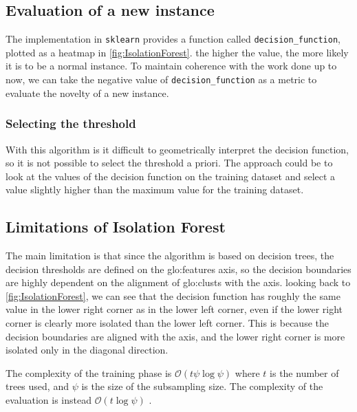 \subsection{Evaluation of a new instance}
\label{sec:iforest_eval}
The implementation in \texttt{sklearn} provides a function called \texttt{decision\_function}, plotted as a heatmap in \autoref{fig:IsolationForest}. the higher the value, the more likely it is to be a normal instance.
To maintain coherence with the work done up to now, we can take the negative value of \texttt{decision\_function} as a metric to evaluate the novelty of a new instance.

\subsubsection{Selecting the threshold}
\label{sec:iforest_threshold}
With this algorithm is it difficult to geometrically interpret the decision function, so it is not possible to select the threshold a priori. The approach could be to look at the values of the decision function on the training dataset and select a value slightly higher than the maximum value for the training dataset.

\subsection{Limitations of Isolation Forest}
The main limitation is that since the algorithm is based on decision trees, the decision thresholds are defined on the \gls{glo:feature}s axis, so the decision boundaries are highly dependent on the alignment of \gls{glo:clust}s with the axis. looking back to \autoref{fig:IsolationForest}, we can see that the decision function has roughly the same value in the lower right corner as in the lower left corner, even if the lower right corner is clearly more isolated than the lower left corner. This is because the decision boundaries are aligned with the axis, and the lower right corner is more isolated only in the diagonal direction.

The complexity of the training phase is $\mathcal{O}(t\psi\log\psi)$ where $t$ is the number of trees used, and $\psi$ is the size of the subsampling size. The complexity of the evaluation is instead $\mathcal{O}(t\log\psi)$ \cite{iforest}.
